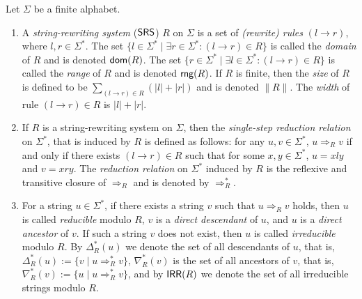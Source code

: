 \begin{definition}
Let $\Sigma$ be a finite alphabet.

\begin{enumerate}
\item A \emph{string-rewriting system} (\index{$\SRS$}$\SRS$) $R$ on $\Sigma$ is a set of \emph{(rewrite) rules} $(l \to r)$, where $l, r \in \Sigma^*$. The set $\{l \in \Sigma^* \mid \exists r \in \Sigma^*: (l \to r) \in R\}$ is called the \emph{domain} of $R$ and is denoted $\textup{\sf dom}(R)$. The set $\{r \in \Sigma^* \mid \exists l \in \Sigma^*: (l \to r) \in R\}$ is called the \emph{range} of $R$ and is denoted $\textup{\sf rng}(R)$. If $R$ is finite, then the \emph{size} of $R$ is defined to be $\sum_{(l \to r) \in R}(|l| + |r|)$ and is denoted $\|R\|$. The \emph{width} of rule $(l \to r) \in R$ is $|l| + |r|$.
\item If $R$ is a string-rewriting system on $\Sigma$, then the \emph{single-step reduction relation} on $\Sigma^*$, that is induced by $R$ is defined as follows: for any $u, v \in \Sigma^*$, $u \Rightarrow_R v$ if and only if there exists $(l \to r) \in R$ such that for some $x, y \in \Sigma^*$, $u = xly$ and $v = xry$. The \emph{reduction relation} on $\Sigma^*$ induced by $R$ is the reflexive and transitive closure of $\Rightarrow_R$ and is denoted by $\Rightarrow^*_R$.
\item For a string $u \in \Sigma^*$, if there exists a string $v$ such that $u \Rightarrow_R v$ holds, then $u$ is called \emph{reducible} modulo $R$, $v$ is a \emph{direct descendant} of $u$, and $u$ is a \emph{direct ancestor} of $v$. If such a string $v$ does not exist, then $u$ is called \emph{irreducible} modulo $R$. By $\Delta_R^*(u)$ we denote the set of all descendants of $u$, that is, $\Delta_R^*(u) := \{v \mid u \Rightarrow_R^* v\}$, $\nabla_R^*(v)$ is the set of all ancestors of $v$, that is, $\nabla_R^*(v) := \{u \mid u \Rightarrow_R^* v\}$, and by $\textup{\sf IRR}(R)$ we denote the set of all irreducible strings modulo $R$.
\end{enumerate}
\end{definition}

